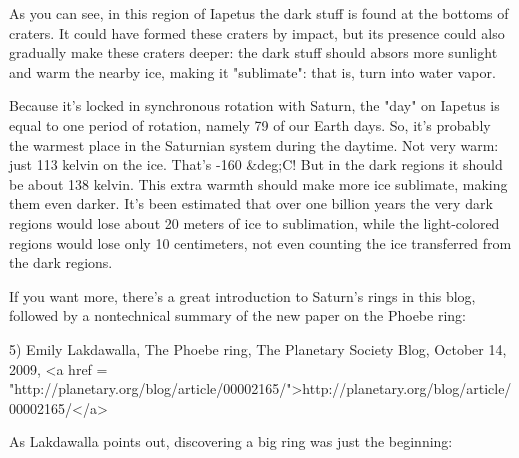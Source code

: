 As you can see, in this region of Iapetus the dark stuff is found
at the bottoms of craters.  It could have formed these craters by impact,
but its presence could also gradually make these craters deeper: 
the dark stuff should absors more sunlight and warm the nearby ice, 
making it "sublimate": that is, turn into water vapor.

Because it's locked in synchronous rotation with Saturn, the
"day" on Iapetus is equal to one period of rotation, namely
79 of our Earth days.  So, it's probably the warmest place in the
Saturnian system during the daytime.  Not very warm: just 113 kelvin
on the ice.  That's -160 &deg;C!  But in the dark regions it should be
about 138 kelvin.  This extra warmth should make more ice sublimate,
making them even darker.  It's been estimated that over one billion
years the very dark regions would lose about 20 meters of ice to
sublimation, while the light-colored regions would lose only 10
centimeters, not even counting the ice transferred from the dark
regions.

If you want more, there's a great introduction to Saturn's rings 
in this blog, followed by a nontechnical summary of the new paper
on the Phoebe ring:

5) Emily Lakdawalla, The Phoebe ring, The Planetary Society Blog, 
October 14, 2009, 
<a href = "http://planetary.org/blog/article/00002165/">http://planetary.org/blog/article/00002165/</a>

As Lakdawalla points out, discovering a big ring was just the 
beginning:

